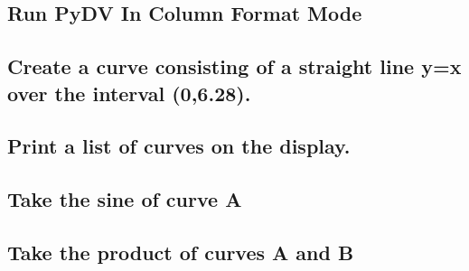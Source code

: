 \documentclass[letterpaper,10pt,english]{sphinxmanual}
\begin{document}
\subsection{Run PyDV In Column Format Mode}
\label{\detokenize{getting_started:run-pydv-in-column-format-mode}}
\begin{sphinxVerbatim}[commandchars=\\\{\}]
  
\end{sphinxVerbatim}


\subsection{Create a curve consisting of a straight line y=x over the interval (0,6.28).}
\label{\detokenize{getting_started:create-a-curve-consisting-of-a-straight-line-y-x-over-the-interval-0-6-28}}
\begin{sphinxVerbatim}[commandchars=\\\{\}]
\PYG{p}{[}\PYG{p}{]}   
\end{sphinxVerbatim}


\subsection{Print a list of curves on the display.}
\label{\detokenize{getting_started:print-a-list-of-curves-on-the-display}}
\begin{sphinxVerbatim}[commandchars=\\\{\}]
\PYG{p}{[}\PYG{p}{]} 
\end{sphinxVerbatim}


\subsection{Take the sine of curve A}
\label{\detokenize{getting_started:take-the-sine-of-curve-a}}
\begin{sphinxVerbatim}[commandchars=\\\{\}]
\PYG{p}{[}\PYG{p}{]}  
\end{sphinxVerbatim}


\subsection{Take the product of curves A and B}
\label{\detokenize{getting_started:take-the-product-of-curves-a-and-b}}
\begin{sphinxVerbatim}[commandchars=\\\{\}]
\PYG{p}{[}\PYG{p}{]}   
\end{sphinxVerbatim}
\end{document}
